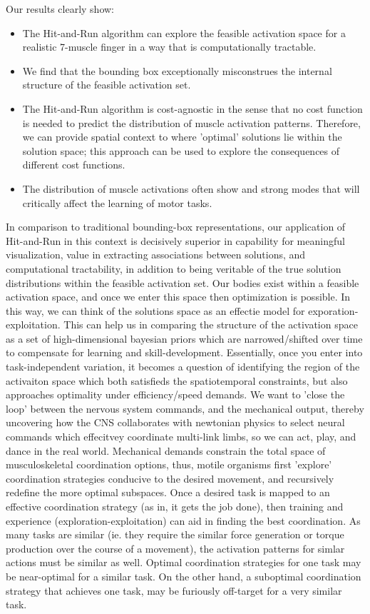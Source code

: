 Our results clearly show:
\begin{itemize}
	\item{The Hit-and-Run algorithm can explore the feasible activation space for a realistic 7-muscle finger in a way that is computationally tractable.}
	\item{We find that the bounding box exceptionally misconstrues the internal structure of the feasible activation set.}
	\item{The Hit-and-Run algorithm is cost-agnostic in the sense that no cost function is needed to predict the distribution of muscle activation patterns. Therefore, we can provide spatial context to where 'optimal' solutions lie within the solution space; this approach can be used to explore the consequences of different cost functions.}
	\item{The distribution of muscle activations often show and strong modes that will critically affect the learning of motor tasks.}
\end{itemize}
In comparison to traditional bounding-box representations, our application of Hit-and-Run in this context is decisively superior in capability for meaningful visualization, value in extracting associations between solutions, and computational tractability, in addition to being veritable of the true solution distributions within the feasible activation set. Our bodies exist within a feasible activation space, and once we enter this space then optimization is possible. In this way, we can think of the solutions space as an effectie model for exporation-exploitation.
This can help us in comparing the structure of the activation space as a set of high-dimensional bayesian priors which are narrowed/shifted over time to compensate for learning and skill-development.
Essentially, once you enter into task-independent variation, it becomes a question of identifying the region of the activaiton space which both satisfieds the spatiotemporal constraints, but also approaches optimality under efficiency/speed demands.
We want to 'close the loop' between the nervous system commands, and the mechanical output, thereby uncovering how the CNS collaborates with newtonian physics to select neural commands which effecitvey coordinate multi-link limbs, so we can act, play, and dance in the real world.
Mechanical demands constrain the total space of musculoskeletal coordination options, thus, motile organisms first 'explore' coordination strategies conducive to the desired movement, and recursively redefine the more optimal subspaces.
Once a desired task is mapped to an effective coordination strategy (as in, it gets the job done), then training and experience (exploration-exploitation) can aid in finding the best coordination.
As many tasks are similar (ie. they require the similar force generation or torque production over the course of a movement),  the activation patterns for simlar actions must be similar as well.
Optimal coordination strategies for one task may be near-optimal for a similar task.
On the other hand, a suboptimal coordination strategy that achieves one task, may be furiously off-target for a very similar task.

